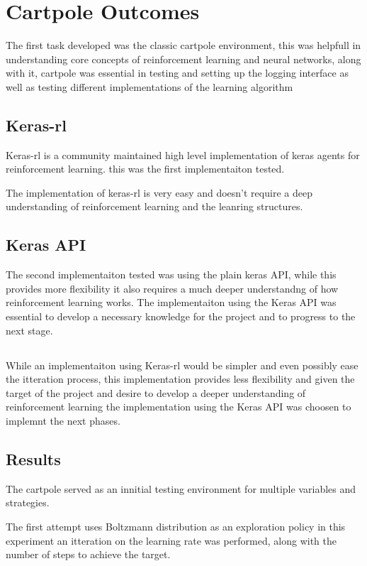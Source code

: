 
\section{Cartpole Outcomes}
The first task developed was the classic cartpole environment,
this was helpfull in understanding core concepts of reinforcement learning and neural networks, along with it,
cartpole was essential in testing and setting up the logging interface as well as testing different implementations of the learning algorithm 
\subsection*{Keras-rl}
Keras-rl is a community maintained high level implementation of keras agents for reinforcement learning. 
this was the first implementaiton tested.

The implementation of keras-rl is very easy and doesn't require a deep understanding of reinforcement learning and the leanring structures.
\subsection*{Keras API}
The second implementaiton tested was using the plain keras API, while this provides more flexibility it also requires a much deeper understandng of how reinforcement learning works.
The implementaiton using the Keras API was essential to develop a necessary knowledge for the project and to progress to the next stage.
\subsection*{}

While an implementaiton using Keras-rl would be simpler and even possibly ease the itteration process, this implementation provides less flexibility and given the target of the project and 
desire to develop a deeper understanding of reinforcement learning the implementation using the Keras API was choosen to implemnt the next phases.

\subsection*{Results}
The cartpole served as an innitial testing environment for multiple variables and strategies.

The first attempt uses Boltzmann distribution as an exploration policy %
in this experiment an itteration on the learning rate was performed, along with the number of steps to achieve the target.

